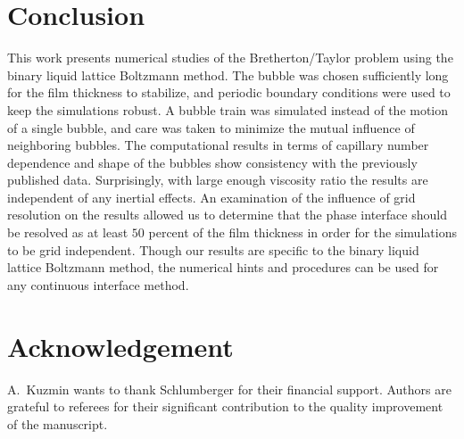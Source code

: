 \documentclass[preprint,12pt]{elsarticle}
\begin{document}
\section{Conclusion}
This work presents numerical studies of the
Bretherton/Taylor problem using the binary liquid lattice Boltzmann method. The bubble was chosen sufficiently long for the film
thickness to
stabilize, and periodic boundary conditions were used to keep the simulations robust.  A bubble
train was simulated instead of the motion of a single bubble, and care was taken to minimize
the mutual influence of neighboring bubbles. The computational
results in terms of capillary number dependence and shape of the bubbles show consistency with the
previously published data. Surprisingly, with large enough viscosity ratio the results are
independent of any inertial effects.  An examination of the influence of grid resolution on the results allowed
us to determine that the phase interface should be resolved as at least $50$ percent of the film thickness
in order for the simulations to be grid independent. Though our results are specific to the binary liquid lattice
Boltzmann method, the numerical hints and procedures can be used for any
continuous interface method.
\section{Acknowledgement}
A.~Kuzmin wants to thank Schlumberger for their financial support. Authors are grateful to referees
for their significant contribution to the quality improvement of the manuscript.


%
%
\end{document}
